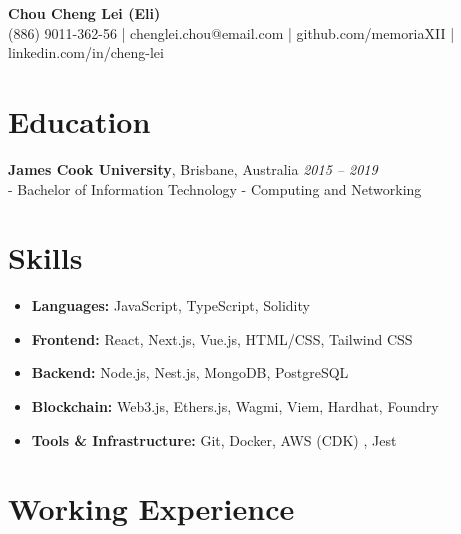 \documentclass[11pt,a4paper]{article}
\begin{document}
\begin{center}
    {\huge \textbf{Chou Cheng Lei (Eli)}}\\
    \vspace{5pt}
    (886) 9011-362-56 | chenglei.chou@email.com | github.com/memoriaXII | linkedin.com/in/cheng-lei
\end{center}

\vspace{0pt}

\section{Education}
\textbf{James Cook University}, Brisbane, Australia \hfill \textit{2015 -- 2019}\\
- Bachelor of Information Technology - Computing and Networking\\

\vspace{0pt}


\section{Skills}
\begin{itemize}[leftmargin=1.5em, itemsep=0pt, topsep=0pt]
  \item \textbf{Languages:} JavaScript, TypeScript, Solidity
  \item \textbf{Frontend:} React, Next.js, Vue.js, HTML/CSS, Tailwind CSS
  \item \textbf{Backend:} Node.js, Nest.js, MongoDB, PostgreSQL
  \item \textbf{Blockchain:} Web3.js, Ethers.js, Wagmi, Viem, Hardhat, Foundry
  \item \textbf{Tools \& Infrastructure:} Git, Docker, AWS (CDK) , Jest
\end{itemize}

\vspace{0pt}

\section{Working Experience}
\end{document}
